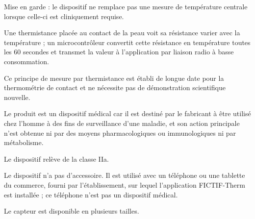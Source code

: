 \documentclass[11pt,a4paper]{article}
\begin{document}
\begin{Form}
{\small Mise en garde : le dispositif ne remplace pas une mesure de température centrale lorsque celle-ci est cliniquement requise.}\par

\par{}\par

{\small Une thermistance placée au contact de la peau voit sa résistance varier avec la température ; un microcontrôleur convertit cette résistance en température toutes les 60 secondes et transmet la valeur à l'application par liaison radio à basse consommation.}\par

{\small Ce principe de mesure par thermistance est établi de longue date pour la thermométrie de contact et ne nécessite pas de démonstration scientifique nouvelle.}\par

\par{}\par

{\small Le produit est un dispositif médical car il est destiné par le fabricant à être utilisé chez l'homme à des fins de surveillance d'une maladie, et son action principale n'est obtenue ni par des moyens pharmacologiques ou immunologiques ni par métabolisme.}\par

\par{}\par

{\small Le dispositif relève de la classe IIa.}\par

\par{}\par

{\small Le dispositif n'a pas d'accessoire. Il est utilisé avec un téléphone ou une tablette du commerce, fourni par l'établissement, sur lequel l'application FICTIF-Therm est installée ; ce téléphone n'est pas un dispositif médical.}\par

\par{}\par

{\small Le capteur est disponible en plusieurs tailles.}\par


\end{Form}
\end{document}
